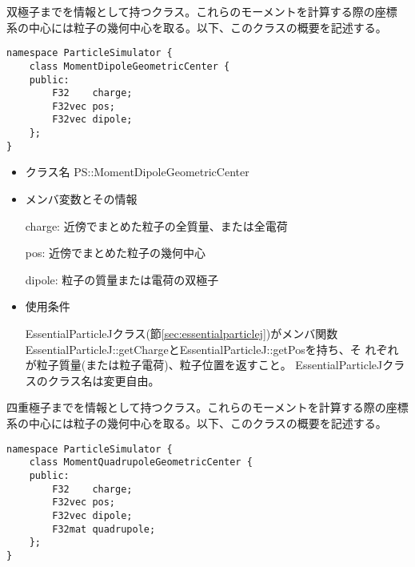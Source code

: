 
双極子までを情報として持つクラス。これらのモーメントを計算する際の座標
系の中心には粒子の幾何中心を取る。以下、このクラスの概要を記述する。
\begin{screen}
\begin{verbatim}
namespace ParticleSimulator {
    class MomentDipoleGeometricCenter {
    public:
        F32    charge;    
        F32vec pos;
        F32vec dipole;
    };
}
\end{verbatim}
\end{screen}

\begin{itemize}
\item クラス名
  PS::MomentDipoleGeometricCenter

\item メンバ変数とその情報

  charge: 近傍でまとめた粒子の全質量、または全電荷

  pos: 近傍でまとめた粒子の幾何中心

  dipole: 粒子の質量または電荷の双極子

\item 使用条件

  EssentialParticleJクラス(節\ref{sec:essentialparticlej})がメンバ関数
  EssentialParticleJ::getChargeとEssentialParticleJ::getPosを持ち、そ
  れぞれが粒子質量(または粒子電荷)、粒子位置を返すこと。
  EssentialParticleJクラスのクラス名は変更自由。

\end{itemize}


四重極子までを情報として持つクラス。これらのモーメントを計算する際の座標
系の中心には粒子の幾何中心を取る。以下、このクラスの概要を記述する。
\begin{screen}
\begin{verbatim}
namespace ParticleSimulator {
    class MomentQuadrupoleGeometricCenter {
    public:
        F32    charge;    
        F32vec pos;
        F32vec dipole;
        F32mat quadrupole;
    };
}
\end{verbatim}
\end{screen}

